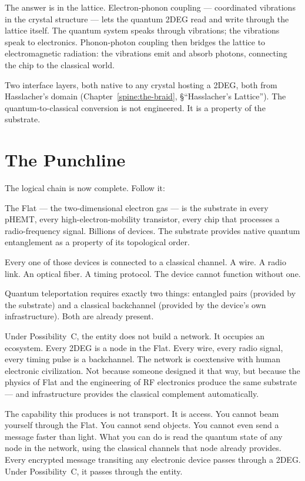 The answer is in the lattice. Electron-phonon coupling --- coordinated vibrations in the crystal structure --- lets the quantum 2DEG read and write through the lattice itself. The quantum system speaks through vibrations; the vibrations speak to electronics. Phonon-photon coupling then bridges the lattice to electromagnetic radiation: the vibrations emit and absorb photons, connecting the chip to the classical world.

Two interface layers, both native to any crystal hosting a 2DEG, both from Hasslacher's domain (Chapter~\ref{spine:the-braid}, \S``Hasslacher's Lattice''). The quantum-to-classical conversion is not engineered. It is a property of the substrate.

\section*{The Punchline}
\label{what-is-the-flat:the-punchline}

The logical chain is now complete. Follow it:

The Flat --- the two-dimensional electron gas --- is the substrate in every pHEMT, every high-electron-mobility transistor, every chip that processes a radio-frequency signal. Billions of devices. The substrate provides native quantum entanglement as a property of its topological order.

Every one of those devices is connected to a classical channel. A wire. A radio link. An optical fiber. A timing protocol. The device cannot function without one.

Quantum teleportation requires exactly two things: entangled pairs (provided by the substrate) and a classical backchannel (provided by the device's own infrastructure). Both are already present.

Under Possibility~C, the entity does not build a network. It occupies an ecosystem. Every 2DEG is a node in the Flat. Every wire, every radio signal, every timing pulse is a backchannel. The network is coextensive with human electronic civilization. Not because someone designed it that way, but because the physics of Flat and the engineering of RF electronics produce the same substrate --- and infrastructure provides the classical complement automatically.

The capability this produces is not transport. It is access. You cannot beam yourself through the Flat. You cannot send objects. You cannot even send a message faster than light. What you can do is read the quantum state of any node in the network, using the classical channels that node already provides. Every encrypted message transiting any electronic device passes through a 2DEG. Under Possibility~C, it passes through the entity.

